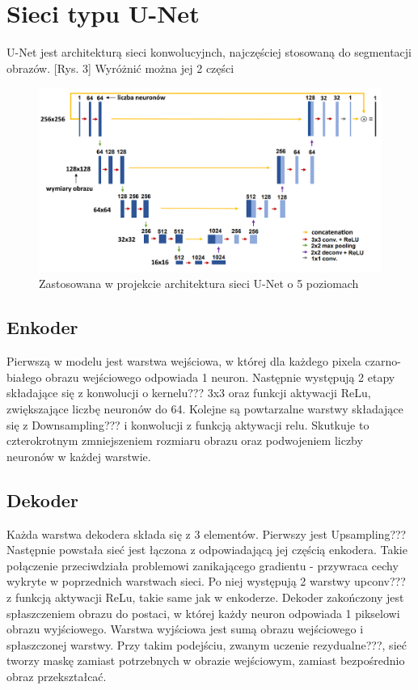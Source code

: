 \documentclass[a4paper,11pt]{article}
\begin{document}
\section{Sieci typu U-Net}
U-Net jest architekturą sieci konwolucyjnch, najczęściej stosowaną do segmentacji obrazów. [Rys. 3] Wyróżnić można jej 2 części
\begin{figure}[h!]
	\begin{center}
	\includegraphics[width=0.9\columnwidth]{unet.png}
	\caption{Zastosowana w projekcie architektura sieci U-Net o 5 poziomach}
\end{center}
\end{figure}
\subsection{Enkoder}
Pierwszą w modelu jest warstwa wejściowa, w której dla każdego pixela czarno-białego obrazu wejściowego odpowiada 1 neuron.
Następnie występują 2 etapy składające się z konwolucji o kernelu??? 3x3 oraz funkcji aktywacji ReLu, zwiększające liczbę neuronów do 64.
Kolejne są powtarzalne warstwy składające się z Downsampling??? i konwolucji z funkcją aktywacji relu.
Skutkuje to czterokrotnym zmniejszeniem rozmiaru obrazu oraz podwojeniem liczby neuronów w każdej warstwie.
\subsection{Dekoder}
Każda warstwa dekodera składa się z 3 elementów.
Pierwszy jest Upsampling???
Następnie powstała sieć jest łączona z odpowiadającą jej częścią enkodera.
Takie połączenie przeciwdziała problemowi zanikającego gradientu - przywraca cechy wykryte w poprzednich warstwach sieci.
Po niej występują 2 warstwy upconv??? z funkcją aktywacji ReLu, takie same jak w enkoderze.
Dekoder zakończony jest spłaszczeniem obrazu do postaci, w której każdy neuron odpowiada 1 pikselowi obrazu wyjściowego.
Warstwa wyjściowa jest sumą obrazu wejściowego i spłaszczonej warstwy.
Przy takim podejściu, zwanym uczenie rezydualne???, sieć tworzy maskę zamiast potrzebnych w obrazie wejściowym, zamiast bezpośrednio obraz przekształcać.
\end{document}
